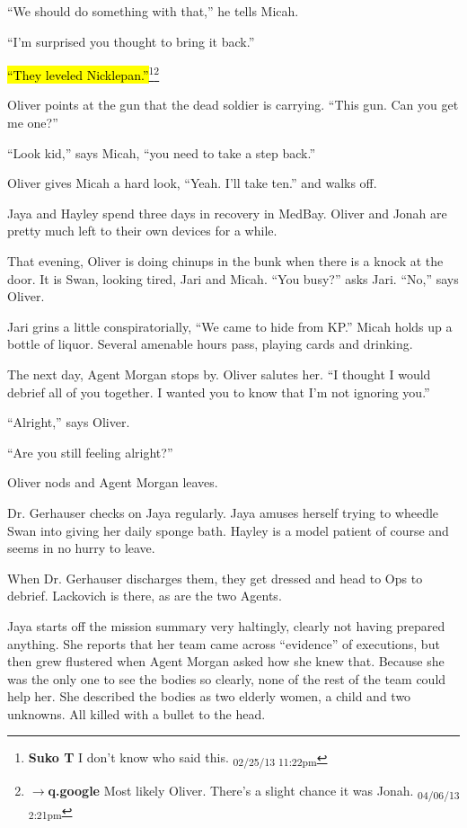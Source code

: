``We should do something with that,'' he tells Micah.

``I'm surprised you thought to bring it back.''

\hl{``They leveled Nicklepan.''}\footnote{\textbf{Suko T }I don't know who said this. \textsubscript{02/25/13 11:22pm}}\footnote{$\rightarrow$\textbf{q.google }Most likely Oliver.  There's a slight chance it was Jonah. \textsubscript{04/06/13 2:21pm}}

Oliver points at the gun that the dead soldier is carrying.  ``This gun.  Can you get me one?''

``Look kid,'' says Micah, ``you need to take a step back.''

Oliver gives Micah a hard look, ``Yeah.  I'll take ten.'' and walks off.



Jaya and Hayley spend three days in recovery in MedBay.  Oliver and Jonah are pretty much left to their own devices for a while.



That evening, Oliver is doing chinups in the bunk when there is a knock at the door.  It is Swan, looking tired, Jari and Micah.  ``You busy?'' asks Jari.  ``No,'' says Oliver.

Jari grins a little conspiratorially, ``We came to hide from KP.''  Micah holds up a bottle of liquor.  Several amenable hours pass, playing cards and drinking.



The next day, Agent Morgan stops by.  Oliver salutes her.  ``I thought I would debrief all of you together.  I wanted you to know that I'm not ignoring you.''

``Alright,'' says Oliver.

``Are you still feeling alright?''

Oliver nods and Agent Morgan leaves.

Dr. Gerhauser checks on Jaya regularly.  Jaya amuses herself trying to wheedle Swan into giving her daily sponge bath.  Hayley is a model patient of course and seems in no hurry to leave.



When Dr. Gerhauser discharges them, they get dressed and head to Ops to debrief.  Lackovich is there, as are the two Agents.



Jaya starts off the mission summary very haltingly, clearly not having prepared anything.  She reports that her team came across ``evidence'' of executions, but then grew flustered when Agent Morgan asked how she knew that.  Because she was the only one to see the bodies so clearly, none of the rest of the team could help her.  She described the bodies as two elderly women, a child and two unknowns.  All killed with a bullet to the head.



